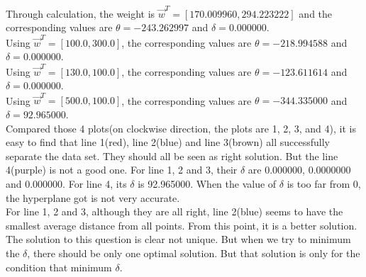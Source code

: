 \begin{enumerate}
\begin{enumerate}
\begin{enumerate}
Through calculation, the weight is $\vec{w}^T = [170.009960, 294.223222]$ and the corresponding values are $\theta =-243.262997$ and $\delta = 0.000000$.\\

Using $\vec{w}^T = [100.0, 300.0]$, the corresponding values are $\theta = -218.994588$ and $\delta = 0.000000$.\\

Using $\vec{w}^T = [130.0, 100.0]$, the corresponding values are $\theta = -123.611614$ and $\delta = 0.000000$.\\

Using $\vec{w}^T = [500.0, 100.0]$, the corresponding values are $\theta =-344.335000$ and $\delta = 92.965000$.\\

Compared those 4 plots(on clockwise direction, the plots are 1, 2, 3, and 4), it is easy to find that line 1(red), line 2(blue) and line 3(brown) all successfully separate the data set. They should all be seen as right solution. But the line 4(purple) is not a good one. For line 1, 2 and 3, their $\delta$ are 0.000000, 0.0000000 and 0.000000. For line 4, its $\delta$ is 92.965000. When the value of $\delta$ is too far from 0, the hyperplane got is not very accurate.\\

For line 1, 2 and 3, although they are all right, line 2(blue) seems to have the smallest average distance from all points. From this point, it is a better solution.\\

The solution to this question is clear not unique. But when we try to minimum the $\delta$, there should be only one optimal solution. But that solution is only for the condition that minimum $\delta$.\\

\end{enumerate}

\end{enumerate}

\end{enumerate}



